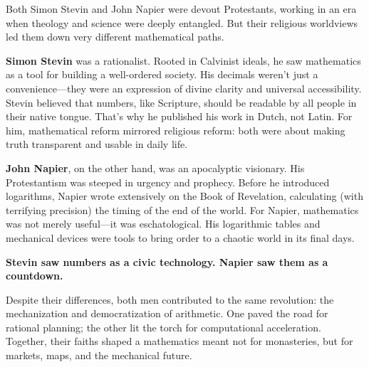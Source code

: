 \begin{tcolorbox}[colback=gray!5!white, colframe=black!80!white, title={Historical Sidebar: Rationalist vs. Prophet — Two Protestant Visions of Mathematics}, fonttitle=\bfseries, arc=1.5mm, boxrule=0.4pt]
    
    Both Simon Stevin and John Napier were devout Protestants, working in an era when theology and science were deeply entangled. But their religious worldviews led them down very different mathematical paths.
    
    \textbf{Simon Stevin} was a rationalist. Rooted in Calvinist ideals, he saw mathematics as a tool for building a well-ordered society. His decimals weren’t just a convenience—they were an expression of divine clarity and universal accessibility. Stevin believed that numbers, like Scripture, should be readable by all people in their native tongue. That’s why he published his work in Dutch, not Latin. For him, mathematical reform mirrored religious reform: both were about making truth transparent and usable in daily life.
    
    \textbf{John Napier}, on the other hand, was an apocalyptic visionary. His Protestantism was steeped in urgency and prophecy. Before he introduced logarithms, Napier wrote extensively on the Book of Revelation, calculating (with terrifying precision) the timing of the end of the world. For Napier, mathematics was not merely useful—it was eschatological. His logarithmic tables and mechanical devices were tools to bring order to a chaotic world in its final days.
    
    \medskip
    
    \textbf{Stevin saw numbers as a civic technology. Napier saw them as a countdown.}
    
    \medskip
    
    Despite their differences, both men contributed to the same revolution: the mechanization and democratization of arithmetic. One paved the road for rational planning; the other lit the torch for computational acceleration. Together, their faiths shaped a mathematics meant not for monasteries, but for markets, maps, and the mechanical future.
\end{tcolorbox}
    